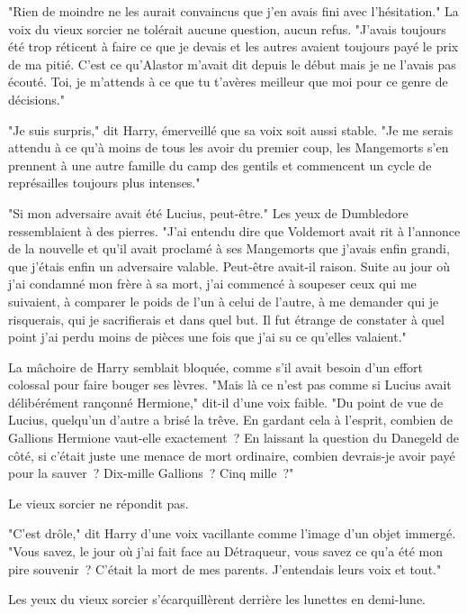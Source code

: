 "Rien de moindre ne les aurait convaincus que j'en avais fini avec l'hésitation." La voix du vieux sorcier ne tolérait aucune question, aucun refus. "J'avais toujours été trop réticent à faire ce que je devais et les autres avaient toujours payé le prix de ma pitié. C'est ce qu'Alastor m'avait dit depuis le début mais je ne l'avais pas écouté. Toi, je m'attends à ce que tu t'avères meilleur que moi pour ce genre de décisions."

"Je suis surpris," dit Harry, émerveillé que sa voix soit aussi stable. "Je me serais attendu à ce qu'à moins de tous les avoir du premier coup, les Mangemorts s'en prennent à une autre famille du camp des gentils et commencent un cycle de représailles toujours plus intenses."

"Si mon adversaire avait été Lucius, peut-être." Les yeux de Dumbledore ressemblaient à des pierres. "J'ai entendu dire que Voldemort avait rit à l'annonce de la nouvelle et qu'il avait proclamé à ses Mangemorts que j'avais enfin grandi, que j'étais enfin un adversaire valable. Peut-être avait-il raison. Suite au jour où j'ai condamné mon frère à sa mort, j'ai commencé à soupeser ceux qui me suivaient, à comparer le poids de l'un à celui de l'autre, à me demander qui je risquerais, qui je sacrifierais et dans quel but. Il fut étrange de constater à quel point j'ai perdu moins de pièces une fois que j'ai su ce qu'elles valaient."

La mâchoire de Harry semblait bloquée, comme s'il avait besoin d'un effort colossal pour faire bouger ses lèvres. "Mais là ce n'est pas comme si Lucius avait délibérément rançonné Hermione," dit-il d'une voix faible. "Du point de vue de Lucius, quelqu'un d'autre a brisé la trêve. En gardant cela à l'esprit, combien de Gallions Hermione vaut-elle exactement~? En laissant la question du Danegeld de côté, si c'était juste une menace de mort ordinaire, combien devrais-je avoir payé pour la sauver~? Dix-mille Gallions~? Cinq mille~?"

Le vieux sorcier ne répondit pas.

"C'est drôle," dit Harry d'une voix vacillante comme l'image d'un objet immergé. "Vous savez, le jour où j'ai fait face au Détraqueur, vous savez ce qu'a été mon pire souvenir~? C'était la mort de mes parents. J'entendais leurs voix et tout."

Les yeux du vieux sorcier s'écarquillèrent derrière les lunettes en demi-lune.

